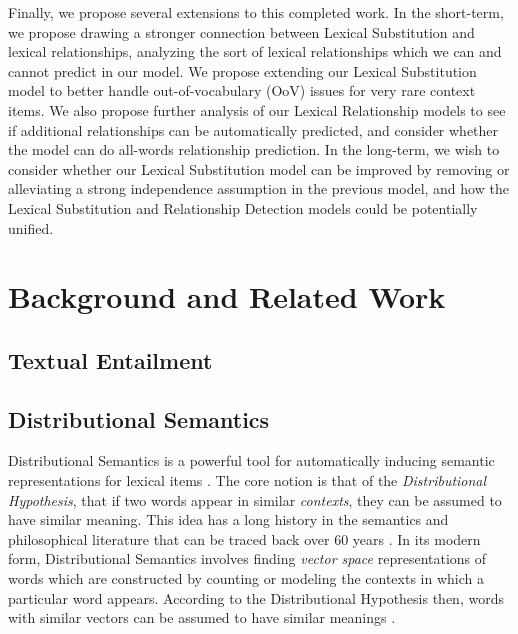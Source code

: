 \documentclass[letterpaper]{article}
\begin{document}
Finally, we propose several extensions to this completed work. In the
short-term, we propose drawing a stronger connection between Lexical
Substitution and lexical relationships, analyzing the sort of lexical
relationships which we can and cannot predict in our model. We propose
extending our Lexical Substitution model to better handle out-of-vocabulary
(OoV) issues for very rare context items. We also propose further analysis of
our Lexical Relationship models to see if additional relationships can be
automatically predicted, and consider whether the model can do all-words
relationship prediction.  In the long-term, we wish to consider whether our
Lexical Substitution model can be improved by removing or alleviating a strong
independence assumption in the previous model, and how the Lexical Substitution
and Relationship Detection models could be potentially unified.


\section{Background and Related Work}

\subsection{Textual Entailment}

\subsection{Distributional Semantics}
Distributional Semantics is a powerful tool for automatically inducing semantic
representations for lexical items \cite{turney:2010:jair,erk:2012:llc}.  The
core notion is that of the {\em Distributional Hypothesis}, that if two words
appear in similar {\em contexts}, they can be assumed to have similar meaning.
This idea has a long history in the semantics and philosophical literature that
can be traced back over 60 years
\cite{wittgenstein:1953:pi,harris:1954:word,firth:1957:la}. In its modern form,
Distributional Semantics involves finding {\em vector space} representations of
words which are constructed by counting or modeling the contexts in which a
particular word appears. According to the Distributional Hypothesis then, words
with similar vectors can be assumed to have similar meanings
\cite{turney:2010:jair}.
\end{document}
